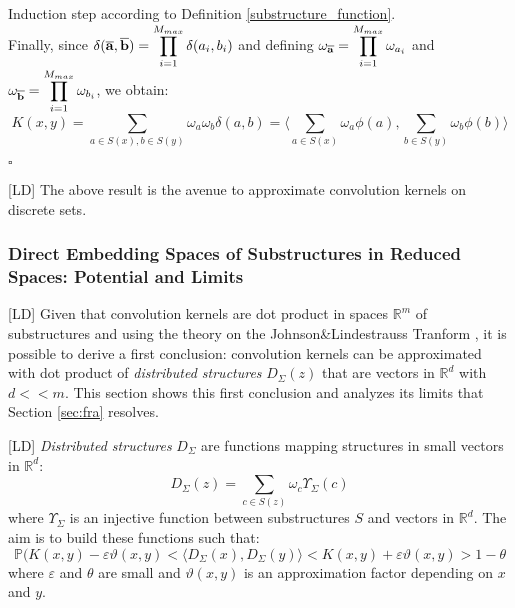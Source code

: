\documentclass[twoside,11pt]{article}
\newenvironment{proof}{{\bf Proof:}}{$\square$ }
\def\substr#1{{\bf\overline{#1}}}
\def\R{\mathbb{R}}
\def\P{\mathbb{P}}
\def\dotprod#1#2{\langle#1,#2\rangle}
\def\OBV#1{\phi(#1)}
\def\df{\Upsilon}
\def\J{\vartheta}
\def\myremove#1{}
\def\myinsert#1{#1}
\def\LD#1{[{\color{blue}L}D] {\color{blue}#1}}
\def\OCAR#1#2#3#4{[{\color{blue}O}{\color{brown}C}{\color{black}A}{\color{purple}R}] {\color{blue}#1} {\color{brown}#2} {\color{black}#3} {\color{purple}#4}}
\begin{document}
\begin{proof}
\begin{paragraph}{Induction step}
according to Definition \ref{substructure_function}.\\
Finally, since $\delta(\substr{a},\substr{b})= \displaystyle\prod_{i=1}^{M_{\myinsert{max}}}\delta(a_i,b_i)$ and \myremove{assuming that} \myinsert{defining} $\omega_{\substr{a}}= \displaystyle\prod_{i=1}^{M_{\myinsert{max}}} \omega_{a_i}$ and  $\omega_{\substr{b}}= \displaystyle\prod_{i=1}^{M_{\myinsert{max}}} \omega_{b_i}$,
we obtain:
\begin{displaymath}
K(x,y) = \displaystyle\sum_{a \in S(x), b \in S(y)} \omega_{a}\omega_{b} \delta(a,b) = \dotprod{\displaystyle\sum_{a\in S(x)} \omega_{a} \OBV{a}}{\displaystyle\sum_{b \in S(y)} \omega_{b} \OBV{b}}
\end{displaymath}
\end{paragraph}
\end{proof}

\LD{The above result is  the avenue to approximate convolution kernels on discrete sets.}




\subsubsection{Direct Embedding Spaces of Substructures in Reduced Spaces: Potential and Limits}
\label{sec:direct_embedding}

\LD{Given that convolution kernels are dot product in spaces $\R^m$ of substructures and using the  theory on the Johnson\&Lindestrauss Tranform \cite{JLL}, it is possible to derive a first conclusion: convolution kernels can be approximated with dot product of \emph{distributed structures} $D_{\Sigma}(z)$ that are vectors in $\R^d$ with $d<<m$.} This section shows this first conclusion and analyzes its limits that Section \ref{sec:fra} resolves.


\LD{\emph{Distributed structures} $D_{\Sigma}$ are functions mapping structures in small vectors in $\R^d$: 
$$
D_{\Sigma}(z)= \displaystyle\sum_{c\in S(z)} \omega_{c} \df_{\Sigma}(c)
$$
where $\df_{\Sigma}$ is an injective function between substructures $S$ and vectors in $\R^d$. }
The aim is to build these functions such that:
$$
\P(K(x,y) - \varepsilon\J(x,y)<\dotprod{D_{\Sigma}(x)}{D_{\Sigma}(y)}<K(x,y) + \varepsilon \J(x,y) > 1 - \theta
$$
where $\varepsilon$ and $\theta$ are small and $\J(x,y)$ is an approximation factor depending on $x$ and $y$.
\end{document}
